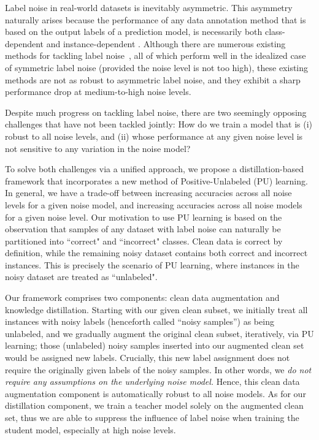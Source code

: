 \documentclass[conference]{IEEEtran}
\begin{document}
Label noise in real-world datasets is inevitably asymmetric. This asymmetry naturally arises because the performance of any data annotation method that is based on the output labels of a prediction model, is necessarily both class-dependent and instance-dependent \cite{Cheng2018:SurveyAutoImageAnnotation}. Although there are numerous existing methods for tackling label noise~\cite{reed2014training, ghosh2017robust, patrini2017making, hendrycks2018using, tanaka2018joint, zhang2018generalized, arazo2019unsupervised, shu2019meta, wang2019symmetric, xu2019l_dmi, zhang2019metacleaner,li2020dividemix,ma2020normalized}, all of which perform well in the idealized case of symmetric label noise (provided the noise level is not too high), these existing methods are not as robust to asymmetric label noise, and they exhibit a sharp performance drop at medium-to-high noise levels.

Despite much progress on tackling label noise, there are two seemingly opposing challenges that have not been tackled jointly: How do we train a model that is (i) robust to all noise levels, and (ii) whose performance at any given noise level is not sensitive to any variation in the noise model?


To solve both challenges via a unified approach, we propose a distillation-based framework that incorporates a new method of Positive-Unlabeled (PU) learning. 
In general, we have a trade-off between increasing accuracies across all noise levels for a given noise model, and increasing accuracies across all noise models for a given noise level. 
Our motivation to use PU learning is based on the observation that samples of any dataset with label noise can naturally be partitioned into ``correct" and ``incorrect" classes.
Clean data is correct by definition, while the remaining noisy dataset contains both correct and incorrect instances.
This is precisely the scenario of PU learning, where instances in the noisy dataset are treated as ``unlabeled".

Our framework comprises two components: clean data augmentation and knowledge distillation.
Starting with our given clean subset, we initially treat all instances with noisy labels (henceforth called ``noisy samples'') as being unlabeled, and we gradually augment the original clean subset, iteratively, via PU learning; those (unlabeled) noisy samples inserted into our augmented clean set would be assigned new labels. 
Crucially, this new label assignment does not require the originally given labels of the noisy samples. 
In other words, we \emph{do not require any assumptions on the underlying noise model.} Hence, this clean data augmentation component is automatically robust to all noise models. 
As for our distillation component, we train a teacher model solely on the augmented clean set, thus we are able to suppress the influence of label noise when training the student model, especially at high noise levels.
\end{document}
